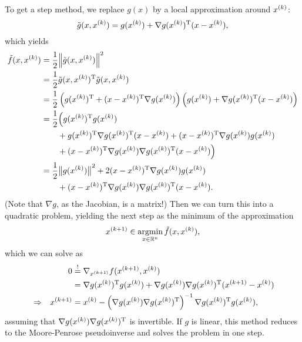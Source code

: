 \documentclass{article}
\begin{document}
To get a step method, we replace \(g(x)\) by a local approximation around \(\kth{x}\):
\begin{equation*}
  \tilde{g}(x, \kth{x}) = g(\kth{x}) + \T{\nabla g(\kth{x})}(x - \kth{x}),
\end{equation*}
which yields
\begin{align*}
  \tilde{f}(x, \kth{x})
    &= \frac{1}{2} \enVert{\tilde{g}(x, \kth{x})}^2 \\
    &= \frac{1}{2} \T{\tilde{g}(x, \kth{x})}\tilde{g}(x, \kth{x}) \\
    &= \frac{1}{2} \left( \T{g(\kth{x})} + \T{(x - \kth{x})}\nabla g(\kth{x}) \right)
      \left( g(\kth{x}) + \T{\nabla g(\kth{x})}(x - \kth{x}) \right) \\
    &= \frac{1}{2} \Big( \T{g(\kth{x})}g(\kth{x}) \\
    &\qquad + \T{g(\kth{x})}\T{\nabla g(\kth{x})}(x - \kth{x}) + \T{(x - \kth{x})}\nabla
      g(\kth{x})g(\kth{x}) \\
    &\qquad + \T{(x - \kth{x})}\nabla g(\kth{x})\T{\nabla g(\kth{x})}(x - \kth{x}) \Big) \\
    &= \frac{1}{2} \enVert[1]{g(\kth{x})}^2 + 2\T{(x - \kth{x})} \nabla g(\kth{x})g(\kth{x}) \\
    &\qquad + \T{(x - \kth{x})} \nabla g(\kth{x})\T{\nabla g(\kth{x})}(x - \kth{x}).
\end{align*}
(Note that \(\nabla g\), as the Jacobian, is a matrix!)  Then we can turn this into a quadratic
problem, yielding the next step as the minimum of the approximation
\begin{equation*}
  \kth[k+1]{x} \in \argmin_{x \in \RR^n} \tilde{f}(x, \kth{x}),
\end{equation*}
which we can solve as
\begin{align*}
  & & 0 &\overset{!}{=} \nabla_{\kth[k+1]{x}} f(\kth[k+1]{x}, \kth{x}) \\
  & & &= \T{\nabla g(\kth{x})} g(\kth{x})
        + \nabla g(\kth{x})\T{\nabla g(\kth{x})} (\kth[k+1]{x} - \kth{x}) \\
  &\Rightarrow  & \kth[k+1]{x} &= \kth{x} - \left(\nabla g(\kth{x}) \T{\nabla
                 g(\kth{x})}\right)^{-1}
                 \T{\nabla g(\kth{x})} g(\kth{x}),
\end{align*}
assuming that \(\nabla g(\kth{x}) \T{\nabla g(\kth{x})}\) is invertible.  If \(g\) is linear, this
method reduces to the Moore-Penrose pseudoinverse and solves the problem in one step.
\end{document}
